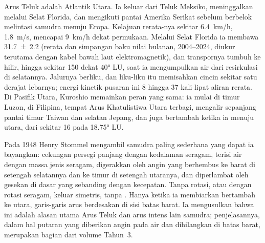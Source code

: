 Arus Teluk adalah  Atlantik Utara. Ia keluar dari Teluk Meksiko, meninggalkan melalui Selat Florida, dan mengikuti pantai Amerika Serikat sebelum berbelok melintasi samudra menuju Eropa. Kelajuan rerata-nya sekitar \qty{6.4}{km/h}, \qty{1.8}{m/s}, mencapai \qty{9}{km/h} dekat permukaan. Melalui Selat Florida ia membawa \qty[uncertainty-mode=separate]{31.7 \pm 2.2}{\sverdrup} (rerata dan simpangan baku nilai bulanan, 2004--2024, diukur terutama dengan kabel bawah laut elektromagnetik), dan transpornya tumbuh ke hilir, hingga sekitar \qty{150}{\sverdrup} dekat \ang{40} LU, saat ia mengumpulkan air dari resirkulasi di selatannya. Jalurnya berliku, dan liku-liku itu memisahkan cincin sekitar satu derajat lebarnya; energi kinetik pusaran ini 8 hingga 37 kali lipat aliran rerata. Di Pasifik Utara, Kuroshio memainkan peran yang sama: ia mulai di timur Luzon, di Filipina, tempat Arus Khatulistiwa Utara terbagi, mengalir sepanjang pantai timur Taiwan dan selatan Jepang, dan juga bertambah ketika ia menuju utara, dari sekitar \qty{16}{\sverdrup} pada \ang{18.75} LU.

\begin{history}[Stommel 1948]
Pada 1948 Henry Stommel mengambil samudra paling sederhana yang dapat ia bayangkan: cekungan persegi panjang dengan kedalaman seragam, terisi air dengan massa jenis seragam, digerakkan oleh angin yang berhembus ke barat di setengah selatannya dan ke timur di setengah utaranya, dan diperlambat oleh gesekan di dasar yang sebanding dengan kecepatan. Tanpa rotasi, atau dengan rotasi seragam,  keluar simetris, tanpa . Hanya ketika ia membiarkan  bertambah ke utara, garis-garis arus berdesakan di sisi batas barat. Ia mengusulkan bahwa ini adalah alasan utama Arus Teluk dan arus intens lain samudra; penjelasannya, dalam hal putaran yang diberikan angin pada air dan dihilangkan di batas barat, merupakan bagian dari volume Tahun~3.
\end{history}

